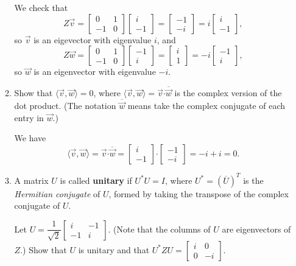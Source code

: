 \documentclass[12pt]{article}
\renewcommand{\i}{\mathbf{i}}
\newcommand{\dotp}{\boldsymbol{\cdot}}
\newcommand{\bbm}{\begin{bmatrix}}
\newcommand{\ebm}{\end{bmatrix}}
\begin{document}
\begin{enumerate}
\begin{enumerate}
\bigskip

We check that
\[
 Z\vec{v} = \bbm 0&1\\-1&0\ebm\bbm i\\-1\ebm = \bbm-1\\-i\ebm = i\bbm i\\-1\ebm,
\]
so $\vec{v}$ is an eigevector with eigenvalue $i$, and
\[
 Z\vec{w} = \bbm 0&1\\-1&0\ebm\bbm -1\\i\ebm = \bbm i\\1\ebm = -i\bbm -1\\i\ebm,
\]
so $\vec{w}$ is an eigenvector with eigenvalue $-i$.

\item Show that $\langle \vec{v},\vec{w}\rangle = 0$, where $\langle \vec{v},\vec{w}\rangle = \vec{v}\dotp \overline{\vec{w}}$ is the complex version of the dot product. (The notation $\overline{\vec{w}}$ means take the complex conjugate of each entry in $\vec{w}$.) 

\bigskip

We have
\[
 \langle \vec{v},\vec{w}\rangle = \vec{v}\dotp\overline{\vec{w}} = \bbm i\\-1\ebm \dotp \bbm -1\\-i\ebm = -i+i=0.
\]

\item A matrix $U$ is called \textbf{unitary} if $U^*U=I$, where $U^*=(\overline{U})^T$ is the \textit{Hermitian conjugate} of $U$, formed by taking the transpose of the complex conjugate of $U$.

Let $U = \dfrac{1}{\sqrt{2}}\bbm i&-1\\-1&i\ebm$. (Note that the columns of $U$ are eigenvectors of $Z$.) Show that $U$ is unitary and that $U^*ZU = \bbm i&0\\0&-i\ebm$.

\bigskip


\end{enumerate}
\end{enumerate}
\end{document}
